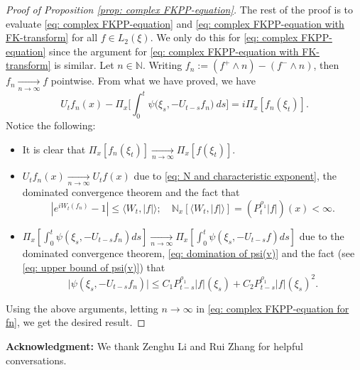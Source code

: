 \documentclass[12pt,a4paper]{amsart}
\theoremstyle{plain}
\theoremstyle{definition}
\numberwithin{equation}{section}
\begin{document}
\begin{proof}[Proof of Proposition \ref{prop: complex FKPP-equation}]
    The rest of the proof is to evaluate \eqref{eq: complex FKPP-equation} and \eqref{eq: complex FKPP-equation with FK-transform} for all $f\in L_2(\xi)$. We only do this for \eqref{eq: complex FKPP-equation} since the argument for \eqref{eq: complex FKPP-equation with FK-transform} is similar.
    Let $n \in \mathbb N$.
    Writing $f_n := (f^+ \wedge n) - (f^- \wedge n)$, then $f_n \xrightarrow[n\to \infty]{} f$ pointwise.
    From what we have proved, we have
\begin{equation}
\label{eq: complex FKPP-equation for fn}
    U_tf_n(x) - \Pi_{x} \Big[\int_0^t \psi\big(\xi_s, - U_{t-s}f_n\big) ~ds\Big]
    = i \Pi_{x} [f_n(\xi_t)].
\end{equation}
    Notice the following:
\begin{itemize}
\item
    It is clear that $\Pi_{x}[f_n(\xi_t)] \xrightarrow[n\to \infty]{} \Pi_{x}[f(\xi_t)]$.
\item
    $U_tf_n(x) \xrightarrow[n\to \infty]{} U_tf(x)$ due to \eqref{eq: N and characteristic exponent}, the dominated convergence theorem and the fact that
\[
    |e^{i W_t(f_n)} - 1| \leq \langle W_t, |f|\rangle;
    \quad \mathbb N_x[\langle W_t, |f|\rangle] = (P_t^{\rho_1} |f|)(x) < \infty.
\]
\item
    $\Pi_{x} [\int_0^t \psi(\xi_s,- U_{t-s}f_n)ds] \xrightarrow[n\to \infty]{} \Pi_{x} [\int_0^t \psi(\xi_s,- U_{t-s}f)ds]$ due to the dominated convergence theorem, \eqref{eq: domination of psi(v)} and the fact (see \eqref{eq: upper bound of psi(v)}) that
\begin{equation}
    \big|\psi(\xi_s,- U_{t-s}f_n)\big|
    \leq C_1 P_{t-s}^{\rho_1}|f|(\xi_s)+C_2 P_{t-s}^{\rho_1}|f|(\xi_s)^2.
\end{equation}
\end{itemize}
    Using the above arguments, letting $n \to \infty$ in \eqref{eq: complex FKPP-equation for fn}, we get the desired result.
\end{proof}

\bigskip
\noindent
{\bf Acknowledgment:}
	We thank Zenghu Li and Rui Zhang for helpful conversations.
\bigskip
\end{document}
